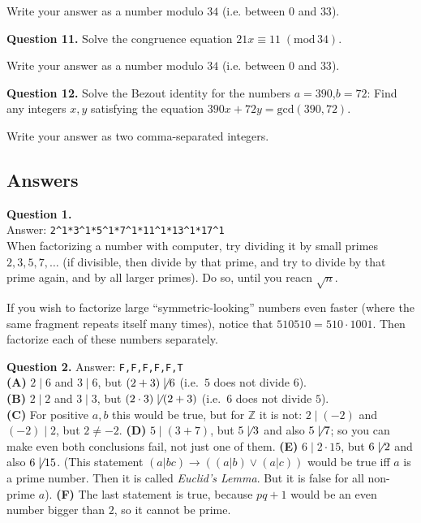 \documentclass[jou]{apa6}
\begin{document}
Write your answer as a number modulo $34$ (i.e. between $0$ and $33$). 

\vspace{6pt}
{\bf Question 11.} Solve the congruence equation $21x \equiv 11\;(\text{mod}\,34)$. 

Write your answer as a number modulo $34$ (i.e. between $0$ and $33$). 

\vspace{6pt}
{\bf Question 12.} Solve the Bezout identity for the numbers $a=390$,$b=72$: Find any integers $x,y$
satisfying the equation $390x + 72y = \text{gcd}(390,72)$. 

Write your answer as two comma-separated integers.






\newpage

\subsection{Answers}

{\bf Question 1.}\\ 
Answer: {\tt 2\^{}1*3\^{}1*5\^{}1*7\^{}1*11\^{}1*13\^{}1*17\^{}1}\\
When factorizing a number with computer, try dividing it by small primes $2,3,5,7,\ldots$
(if divisible, then divide by that prime, and try to divide by that prime again, and by all 
larger primes). Do so, until you reacn $\sqrt{n}$.

If you wish to factorize large ``symmetric-looking'' numbers even faster (where the same 
fragment repeats itself many times), notice
that $510510 = 510 \cdot 1001$. Then 
factorize each of these numbers separately. 

\vspace{6pt}
{\bf Question 2.} Answer: {\tt F,F,F,F,F,T}\\
{\bf (A)} $2 \mid 6$ and $3 \mid 6$, but $(2+3) \not\mid 6$ (i.e.\ $5$ does not divide $6$).\\
{\bf (B)} $2 \mid 2$ and $3 \mid 3$, but $(2 \cdot 3) \not\mid (2+3)$ (i.e.\ $6$ does not divide $5$).\\
{\bf (C)} For positive $a,b$ this would be true, but for $\mathbb{Z}$ it is not: $2 \mid (-2)$ and $(-2) \mid 2$, 
but $2 \neq -2$. 
{\bf (D)} $5 \mid (3+7)$, but $5 \not\mid 3$ and also $5 \not\mid 7$; so you can make even both conclusions fail, 
not just one of them.
{\bf (E)} $6 \mid 2 \cdot 15$, but $6 \not\mid 2$ and also $6 \not\mid 15$. (This statement 
$(a | bc) \rightarrow ((a | b) \vee (a | c))$ would be true iff $a$ is a prime number. Then it is called
{\em Euclid's Lemma}. But it is false for all non-prime $a$).
{\bf (F)} The last statement is true, because $pq+1$ would be an even number bigger than $2$, so it cannot be prime.
\end{document}

